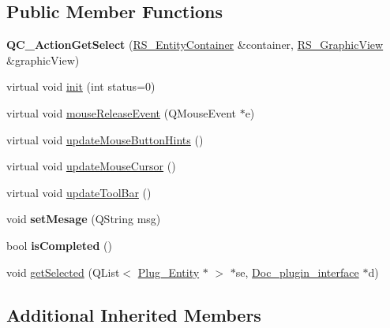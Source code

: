 \subsection*{Public Member Functions}
\begin{DoxyCompactItemize}
\item 
\hypertarget{classQC__ActionGetSelect_a16f674bcce6894894fff3b90a56af7fb}{{\bfseries Q\-C\-\_\-\-Action\-Get\-Select} (\hyperlink{classRS__EntityContainer}{R\-S\-\_\-\-Entity\-Container} \&container, \hyperlink{classRS__GraphicView}{R\-S\-\_\-\-Graphic\-View} \&graphic\-View)}\label{classQC__ActionGetSelect_a16f674bcce6894894fff3b90a56af7fb}

\item 
virtual void \hyperlink{classQC__ActionGetSelect_a066acb57495e4a15669cc6b9b2ea10ce}{init} (int status=0)
\item 
virtual void \hyperlink{classQC__ActionGetSelect_aa1b4395fea31e9b509e1775a741bfcfb}{mouse\-Release\-Event} (Q\-Mouse\-Event $\ast$e)
\item 
virtual void \hyperlink{classQC__ActionGetSelect_ad33ab6700decba44190cf5daa515a188}{update\-Mouse\-Button\-Hints} ()
\item 
virtual void \hyperlink{classQC__ActionGetSelect_a107d0a73b40f179c1830001e937013f6}{update\-Mouse\-Cursor} ()
\item 
virtual void \hyperlink{classQC__ActionGetSelect_af89f133fff86dd5bab9debbac6a5b435}{update\-Tool\-Bar} ()
\item 
\hypertarget{classQC__ActionGetSelect_af64ee49fa5889f65c0e607a076c51375}{void {\bfseries set\-Mesage} (Q\-String msg)}\label{classQC__ActionGetSelect_af64ee49fa5889f65c0e607a076c51375}

\item 
\hypertarget{classQC__ActionGetSelect_ac032c1f26f54957c9b68ef1d56ebfeca}{bool {\bfseries is\-Completed} ()}\label{classQC__ActionGetSelect_ac032c1f26f54957c9b68ef1d56ebfeca}

\item 
void \hyperlink{classQC__ActionGetSelect_a39310ab2d5c36e97589e437eb1766b3b}{get\-Selected} (Q\-List$<$ \hyperlink{classPlug__Entity}{Plug\-\_\-\-Entity} $\ast$ $>$ $\ast$se, \hyperlink{classDoc__plugin__interface}{Doc\-\_\-plugin\-\_\-interface} $\ast$d)
\end{DoxyCompactItemize}
\subsection*{Additional Inherited Members}


